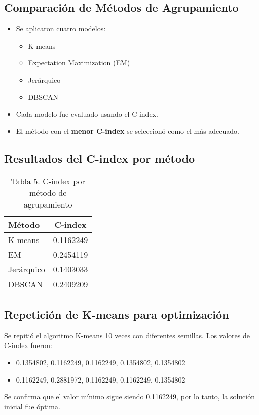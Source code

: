 \documentclass[12pt]{report}
\begin{document}
\subsection{Comparación de Métodos de Agrupamiento}
\begin{itemize}
    \item Se aplicaron cuatro modelos:
    \begin{itemize}
        \item K-means
        \item Expectation Maximization (EM)
        \item Jerárquico
        \item DBSCAN
    \end{itemize}
    \item Cada modelo fue evaluado usando el C-index.
    \item El método con el \textbf{menor C-index} se seleccionó como el más adecuado.
\end{itemize}

\subsection{Resultados del C-index por método}
\begin{table}[H]
\centering
\begin{tabular}{|l|c|}
\hline
\textbf{Método} & \textbf{C-index} \\
\hline
K-means & 0.1162249 \\
EM & 0.2454119 \\
Jerárquico & 0.1403033 \\
DBSCAN & 0.2409209 \\
\hline
\end{tabular}
\caption{Tabla 5. C-index por método de agrupamiento}
\end{table}

\subsection{Repetición de K-means para optimización}
Se repitió el algoritmo K-means 10 veces con diferentes semillas. Los valores de C-index fueron:
\begin{itemize}
    \item 0.1354802, 0.1162249, 0.1162249, 0.1354802, 0.1354802
    \item 0.1162249, 0.2881972, 0.1162249, 0.1162249, 0.1354802
\end{itemize}
Se confirma que el valor mínimo sigue siendo 0.1162249, por lo tanto, la solución inicial fue óptima.
\end{document}
